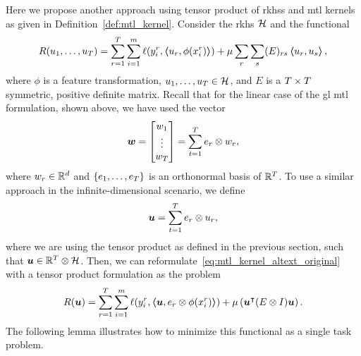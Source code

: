 Here we propose another approach using tensor product of \acrshort{rkhss} and \acrshort{mtl} kernels as given in Definition~\ref{def:mtl_kernel}. 
Consider the \acrshort{rkhs} $\mathcal{H}$ and the functional
\begin{equation}
    \label{eq:mtl_kernel_altext_original}
    \begin{aligned}
         & R({u_1, \ldots, u_T}) = \sum_{r=1}^{\ntasks} \sum_{i=1}^\npertask \lossf(y_i^r, \dotp{u_r}{\phi(x_i^r)}) + \mu \sum_r \sum_s (E)_{rs} \dotp{u_r}{u_s} , \\
    \end{aligned}
\end{equation}
where $\phi$ is a feature transformation, $u_1, \ldots, u_T \in \mathcal{H}$, and $E$ is a $T \times T$ symmetric, positive definite matrix.
%
Recall that for the linear case of the \acrshort{gl} \acrshort{mtl} formulation, shown above, we have used the vector
\begin{equation}
    \nonumber
    \bm{w} = 
    \begin{bmatrix}
        w_1 \\
        \vdots \\
        w_T 
    \end{bmatrix}
    = \sum_{t=1}^T e_r \otimes w_r ,
\end{equation}
where $w_r \in \mathbb{R}^d$ and $\left\{e_1, \ldots, e_T\right\}$ is an orthonormal basis of $\mathbb{R}^T$.
To use a similar approach in the infinite-dimensional scenario, we define
\begin{equation}
    \nonumber
    \bm{u} = \sum_{t=1}^T e_r \otimes u_r ,
\end{equation}
where we are using the tensor product as defined in the previous section, such that $\bm{u} \in \mathbb{R}^T \otimes \mathcal{H}$. Then, we can reformulate~\eqref{eq:mtl_kernel_altext_original} with a tensor product formulation as the problem
\begin{equation}
    \label{eq:mtl_kernel_altext_tensor}
    \begin{aligned}
            & R(\myvec{u}) = \sum_{r=1}^{\ntasks} \sum_{i=1}^\npertask \lossf(y_i^r, \dotp{\myvec{u}}{e_r \otimes \phi(x_i^r)}) + \mu \left(  \myvec{u}^\intercal (E \otimes I) \myvec{u} \right). \\
    \end{aligned}
\end{equation}
The following lemma illustrates how to minimize this functional as a single task problem.
